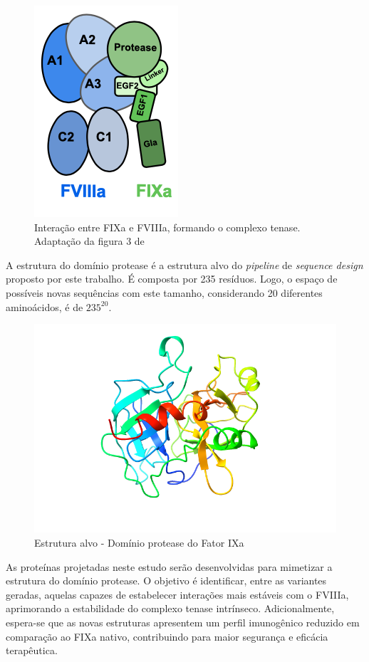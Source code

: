 \begin{figure}[H]
    \centering
    \includegraphics[width=.3\textwidth]{figuras/FIXa_FVIIIa.png}
    \caption[Interação entre FIXa e FVIIIa]{Interação entre FIXa e FVIIIa, formando o complexo tenase. Adaptação da figura 3 de \cite{FIX}}
  \end{figure}

A estrutura do domínio protease é a estrutura alvo do \textit{pipeline} de \textit{sequence design} proposto por este trabalho.  
É composta por 235 resíduos. 
Logo, o espaço de possíveis novas sequências com este tamanho, considerando 20 diferentes aminoácidos, é de $235^{20}$. 

\begin{figure}[H]
    \centering
    \includegraphics[width=.6\textwidth]{figuras/FIX.jpg}
    \caption{Estrutura alvo - Domínio protease do Fator IXa}
  \end{figure}

As proteínas projetadas neste estudo serão desenvolvidas para mimetizar a estrutura do domínio protease.
O objetivo é identificar, entre as variantes geradas, aquelas capazes de estabelecer interações mais estáveis com o FVIIIa,
aprimorando a estabilidade do complexo tenase intrínseco. 
Adicionalmente, espera-se que as novas estruturas apresentem um perfil imunogênico reduzido em comparação ao FIXa nativo, 
contribuindo para maior segurança e eficácia terapêutica.

